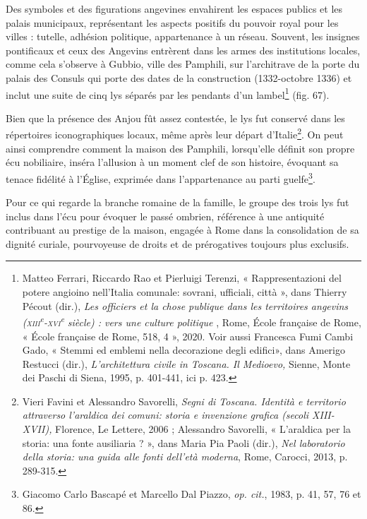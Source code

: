 \documentclass[12pt,twoside,openany]{book}
\begin{document}
Des symboles et des figurations angevines envahirent les espaces publics et les palais municipaux, représentant les aspects positifs du pouvoir royal pour les villes : tutelle, adhésion politique, appartenance à un réseau. Souvent, les insignes pontificaux et ceux des Angevins entrèrent dans les armes des institutions locales, comme cela s’observe à Gubbio, ville des Pamphili, sur l’architrave de la porte du palais des Consuls qui porte des dates de la construction (1332-octobre 1336) et inclut une suite de cinq lys séparés par les pendants d’un lambel\footnote{Matteo Ferrari, Riccardo Rao et Pierluigi Terenzi, « Rappresentazioni del potere angioino nell’Italia comunale: sovrani, ufficiali, città », dans Thierry Pécout (dir.), \textit{Les officiers et la chose publique dans les territoires angevins (}\textit{\textsc{xiii}}\textit{\textsuperscript{e}}\textit{-}\textit{\textsc{xvi}}\textit{\textsuperscript{e}}\textit{ siècle) : vers une culture politique }, Rome, École française de Rome, « École française de Rome, 518, 4 », 2020. Voir aussi Francesca Fumi Cambi Gado, « Stemmi ed emblemi nella decorazione degli edifici», dans Amerigo Restucci (dir.),\textit{ L’architettura civile in Toscana. Il Medioevo, }Sienne, Monte dei Paschi di Siena, 1995, p. 401-441, ici p. 423.} (fig. 67).

Bien que la présence des Anjou fût assez contestée, le lys fut conservé dans les répertoires iconographiques locaux, même après leur départ d’Italie\footnote{Vieri Favini et Alessandro Savorelli, \textit{Segni di Toscana. Identità e territorio attraverso l’araldica dei comuni: storia e invenzione grafica (secoli XIII-XVII),} Florence, Le Lettere, 2006 ; Alessandro Savorelli, « L’araldica per la storia: una fonte ausiliaria ? », dans Maria Pia Paoli (dir.), \textit{Nel laboratorio della storia: una guida alle fonti dell'età moderna}, Rome, Carocci, 2013, p. 289-315.}. On peut ainsi comprendre comment la maison des Pamphili, lorsqu’elle définit son propre écu nobiliaire, inséra l’allusion à un moment clef de son histoire, évoquant sa tenace fidélité à l’Église, exprimée dans l’appartenance au parti guelfe\footnote{Giacomo Carlo Bascapé et Marcello Dal Piazzo, \textit{op. cit.}, 1983, p. 41, 57, 76 et 86.}.

Pour ce qui regarde la branche romaine de la famille, le groupe des trois lys fut inclus dans l’écu pour évoquer le passé ombrien, référence à une antiquité contribuant au prestige de la maison, engagée à Rome dans la consolidation de sa dignité curiale, pourvoyeuse de droits et de prérogatives toujours plus exclusifs.
\end{document}
